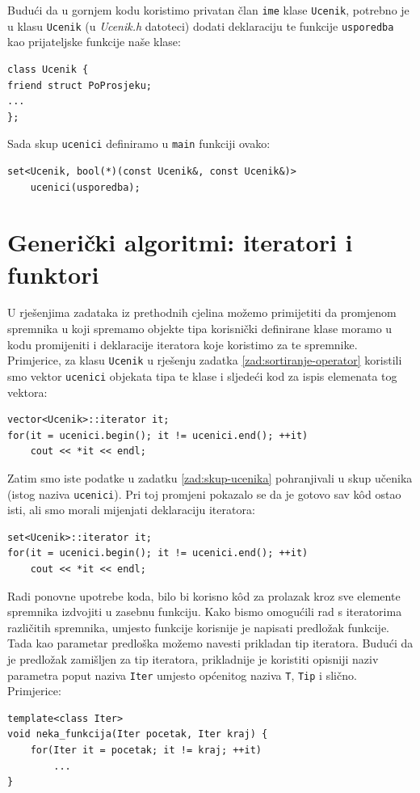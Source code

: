 \begin{rjesenje}
\begin{itemize}
    Budući da u gornjem kodu koristimo privatan član \texttt{ime} klase \texttt{Ucenik}, potrebno je u klasu \texttt{Ucenik} 
        (u \textit{Ucenik.h} datoteci)
    dodati deklaraciju te funkcije \texttt{usporedba} kao prijateljske funkcije naše klase:
    \begin{verbatim}
class Ucenik {
friend struct PoProsjeku;
...
};
    \end{verbatim}
    Sada skup \texttt{ucenici} definiramo u \texttt{main} funkciji ovako:
    \begin{verbatim}
set<Ucenik, bool(*)(const Ucenik&, const Ucenik&)>
    ucenici(usporedba);
    \end{verbatim}
    \end{itemize}
\end{rjesenje}


\section{Generički algoritmi: iteratori i funktori}


U rješenjima zadataka iz prethodnih cjelina
možemo primijetiti da promjenom spremnika u koji spremamo objekte tipa
korisnički definirane klase
moramo u kodu promijeniti i deklaracije iteratora koje koristimo 
za te spremnike.
Primjerice, za klasu \texttt{Ucenik} u rješenju zadatka
\ref{zad:sortiranje-operator} 
koristili smo vektor \texttt{ucenici} 
objekata tipa te klase i sljedeći kod za ispis elemenata tog vektora:

\begin{verbatim}
vector<Ucenik>::iterator it;
for(it = ucenici.begin(); it != ucenici.end(); ++it)
    cout << *it << endl;
\end{verbatim}

Zatim smo iste podatke u zadatku \ref{zad:skup-ucenika} pohranjivali u skup učenika (istog naziva \texttt{ucenici}). 
Pri toj promjeni pokazalo se da je gotovo sav kôd ostao isti, ali smo morali mijenjati deklaraciju iteratora:

\begin{verbatim}
set<Ucenik>::iterator it;
for(it = ucenici.begin(); it != ucenici.end(); ++it)
    cout << *it << endl;
\end{verbatim}

Radi ponovne upotrebe koda, bilo bi korisno kôd za prolazak kroz sve elemente spremnika 
izdvojiti u zasebnu funkciju.
Kako bismo omogućili rad s iteratorima različitih spremnika, umjesto funkcije korisnije je napisati
predložak funkcije.
Tada kao parametar predloška možemo navesti prikladan tip iteratora.
Budući da je predložak zamišljen za tip iteratora, prikladnije je koristiti opisniji naziv parametra
poput naziva \texttt{Iter} umjesto općenitog naziva
\texttt{T}, \texttt{Tip} i slično.
Primjerice:
\begin{verbatim}
template<class Iter>
void neka_funkcija(Iter pocetak, Iter kraj) {
    for(Iter it = pocetak; it != kraj; ++it)
        ...
}
\end{verbatim}


